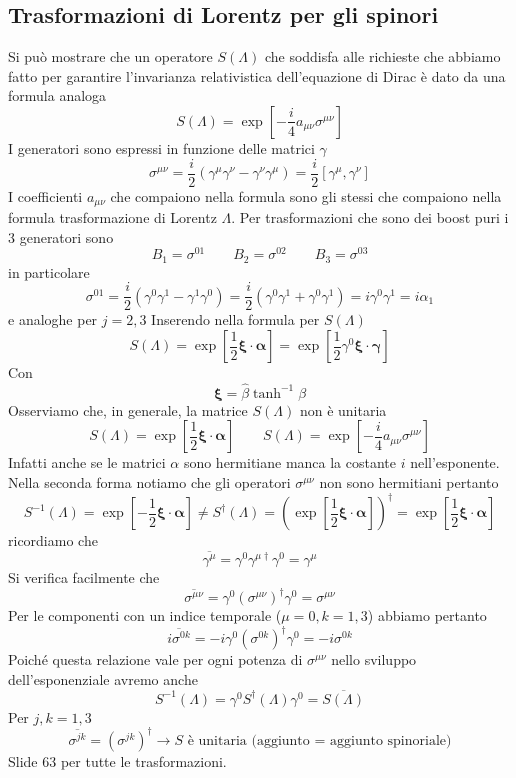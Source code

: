 \subsection{Trasformazioni di Lorentz per gli spinori}
Si può mostrare che un operatore $S(\Lambda)$ che soddisfa alle richieste che abbiamo fatto per garantire l'invarianza relativistica dell'equazione di Dirac è dato da una formula analoga
$$
S(\Lambda) = \exp \left[ -\frac{i}{4} a_{\mu\nu} \sigma^{\mu\nu} \right]
$$
I generatori sono espressi in funzione delle matrici $\gamma$
$$
\sigma^{\mu\nu} = \frac{i}{2}(\gamma^\mu \gamma^\nu - \gamma^\nu \gamma^\mu) = \frac{i}{2}[\gamma^\mu, \gamma^\nu]
$$
I coefficienti $a_{\mu\nu}$ che compaiono nella formula sono gli stessi che compaiono nella formula trasformazione di Lorentz $\Lambda$. Per trasformazioni che sono dei boost puri i 3 generatori sono
$$
B_1 = \sigma^{01} \qquad B_2 = \sigma^{02} \qquad B_3 = \sigma^{03}
$$
in particolare
$$
\sigma^{01} = \frac{i}{2}(\gamma^0 \gamma^1 - \gamma^1 \gamma^0) = \frac{i}{2}(\gamma^0 \gamma^1 + \gamma^0 \gamma^1) = i\gamma^0 \gamma^1 = i\alpha_1
$$
e analoghe per $j=2,3$
Inserendo nella formula per $S(\Lambda)$
$$
S(\Lambda) = \exp \left[ \frac{1}{2} \boldsymbol{\xi} \cdot \boldsymbol{\alpha} \right] = \exp \left[ \frac{1}{2} \gamma^0 \boldsymbol{\xi} \cdot \boldsymbol{\gamma} \right]
$$
Con
$$
\boldsymbol{\xi} = \hat{\beta} \tanh^{-1} \beta
$$
Osserviamo che, in generale, la matrice $S(\Lambda)$ non è unitaria
$$
S(\Lambda) = \exp \left[ \frac{1}{2} \boldsymbol{\xi} \cdot \boldsymbol{\alpha} \right] \qquad S(\Lambda) = \exp \left[ -\frac{i}{4} a_{\mu\nu} \sigma^{\mu\nu} \right]
$$
Infatti anche se le matrici $\alpha$ sono hermitiane manca la costante $i$ nell'esponente. Nella seconda forma notiamo che gli operatori $\sigma^{\mu\nu}$ non sono hermitiani pertanto
$$
S^{-1}(\Lambda) = \exp \left[ -\frac{1}{2} \boldsymbol{\xi} \cdot \boldsymbol{\alpha} \right] \ne S^\dagger(\Lambda) = \left( \exp \left[ \frac{1}{2} \boldsymbol{\xi} \cdot \boldsymbol{\alpha} \right] \right)^\dagger = \exp \left[ \frac{1}{2} \boldsymbol{\xi} \cdot \boldsymbol{\alpha} \right]
$$
ricordiamo che
$$
\overline{\gamma^\mu} = \gamma^0 \gamma^{\mu\dagger} \gamma^0 = \gamma^\mu
$$
Si verifica facilmente che
$$
\overline{\sigma^{\mu\nu}} = \gamma^0 (\sigma^{\mu\nu})^\dagger \gamma^0 = \sigma^{\mu\nu}
$$
Per le componenti con un indice temporale ($\mu=0, k=1,3$) abbiamo pertanto
$$
\overline{i\sigma^{0k}} = -i\gamma^0 (\sigma^{0k})^\dagger \gamma^0 = -i\sigma^{0k}
$$
Poiché questa relazione vale per ogni potenza di $\sigma^{\mu\nu}$ nello sviluppo dell'esponenziale avremo anche
$$
S^{-1}(\Lambda) = \gamma^0 S^\dagger(\Lambda) \gamma^0 = \overline{S(\Lambda)}
$$
Per $j,k=1,3$
$$
\overline{\sigma^{jk}} = (\sigma^{jk})^\dagger \to S \text{ è unitaria (aggiunto = aggiunto spinoriale)}
$$
Slide 63 per tutte le trasformazioni.

